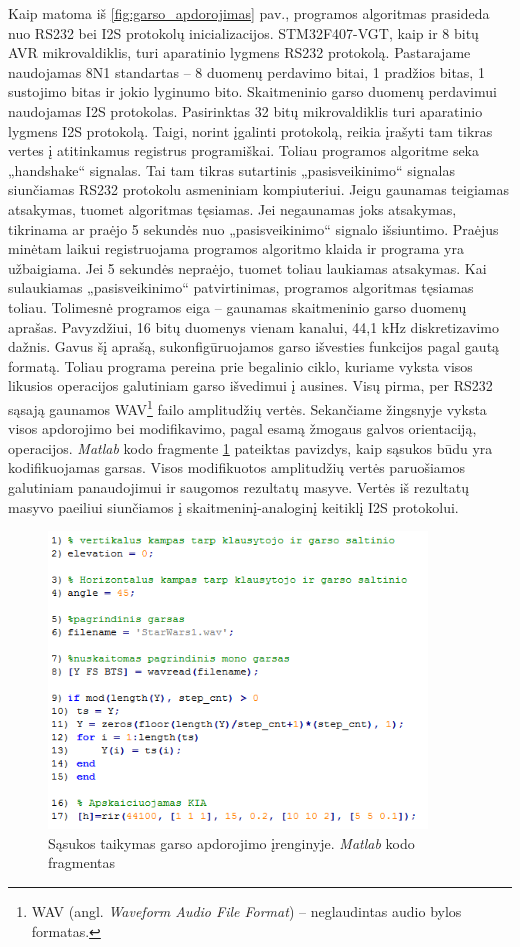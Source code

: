\documentclass[]{vgtuef}
\begin{document}
Kaip matoma iš \ref{fig:garso_apdorojimas} pav., programos algoritmas prasideda nuo RS232 bei I2S protokolų inicializacijos. STM32F407-VGT, kaip ir 8 bitų AVR mikrovaldiklis, turi aparatinio lygmens RS232 protokolą. Pastarajame naudojamas 8N1 standartas – 8 duomenų perdavimo bitai, 1 pradžios bitas, 1 sustojimo bitas ir jokio lyginumo bito. Skaitmeninio garso duomenų perdavimui naudojamas I2S protokolas. Pasirinktas 32 bitų mikrovaldiklis turi aparatinio lygmens I2S protokolą. Taigi, norint įgalinti protokolą, reikia įrašyti tam tikras vertes į atitinkamus registrus programiškai. Toliau programos algoritme seka „handshake“ signalas. Tai tam tikras sutartinis „pasisveikinimo“ signalas siunčiamas RS232 protokolu asmeniniam kompiuteriui. Jeigu gaunamas teigiamas atsakymas, tuomet algoritmas tęsiamas. Jei negaunamas joks atsakymas, tikrinama ar praėjo 5 sekundės nuo „pasisveikinimo“ signalo išsiuntimo. Praėjus minėtam laikui registruojama programos algoritmo klaida ir programa yra užbaigiama. Jei 5 sekundės nepraėjo, tuomet toliau laukiamas atsakymas. Kai sulaukiamas „pasisveikinimo“ patvirtinimas, programos algoritmas tęsiamas toliau. Tolimesnė programos eiga -- gaunamas skaitmeninio garso duomenų aprašas. Pavyzdžiui, 16 bitų duomenys vienam kanalui, 44,1 kHz diskretizavimo dažnis. Gavus šį aprašą, sukonfigūruojamos garso išvesties funkcijos pagal gautą formatą. Toliau programa pereina prie begalinio ciklo, kuriame vyksta visos likusios operacijos galutiniam garso išvedimui į ausines. Visų pirma, per RS232 sąsają gaunamos WAV\footnote{  WAV (angl. \textit{Waveform Audio File Format}) -- neglaudintas audio bylos formatas.} failo amplitudžių vertės. Sekančiame žingsnyje vyksta visos apdorojimo bei modifikavimo, pagal esamą žmogaus galvos orientaciją, operacijos. \textit{Matlab} kodo fragmente \ref{code:conv_sound} pateiktas pavizdys, kaip sąsukos būdu yra kodifikuojamas garsas. Visos modifikuotos amplitudžių vertės paruošiamos galutiniam panaudojimui ir saugomos rezultatų masyve. Vertės iš rezultatų masyvo paeiliui siunčiamos į skaitmeninį-analoginį keitiklį I2S protokolui.

\begin{figure}[!h]
  \centering
  \includegraphics[width=380px]{img/conv1.png}
  \caption{Sąsukos taikymas garso apdorojimo įrenginyje. \textit{Matlab} kodo fragmentas}
  \label{code:conv_sound}
\end{figure}
\end{document}

